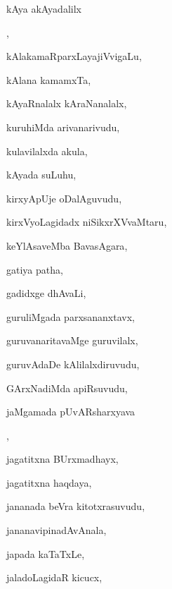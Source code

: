 \begin{multicols}{3}
{\noindent
{kAya akAyadalilx}

\noindent
{}, \pageref{kAya akAyadalilx aDaguvudu}

\noindent
{kAlakamaRparxLayajiVvigaLu}, \pageref{kAlakamaRparxLayajiVvigaLu}

\noindent
{kAlana kamamxTa}, \pageref{kAlana kamamxTa}

\noindent
{kAyaRnalalx kAraNanalalx}, \pageref{kAyaRnalalx kAraNanalalx}

\noindent
{kuruhiMda arivanarivudu}, \pageref{kuruhiMda arivanarivudu}

\noindent
{kulavilalxda akula}, \pageref{kulavilalxda akula}

\noindent
{kAyada suLuhu}, \pageref{kAyada suLuhu}

\noindent
{kirxyApUje oDalAguvudu}, \pageref{kirxyApUje oDalAguvudu}

\noindent
{kirxVyoLagidadx niSikxrXVvaMtaru}, \pageref{kirxVyoLagidadx niSikxrXVvaMtaru}

\noindent
{keYlAsaveMba BavasAgara}, \pageref{keYlAsaveMba BavasAgara}

\noindent
{gatiya patha}, \pageref{gatiya patha}

\noindent
{gadidxge dhAvaLi}, \pageref{gadidxge dhAvaLi}

\noindent
{guruliMgada parxsananxtavx}, \pageref{guruliMgada parxsananxtavx}

\noindent
{guruvanaritavaMge guruvilalx}, \pageref{guruvanaritavaMge guruvilalx}

\noindent
{guruvAdaDe kAlilalxdiruvudu}, \pageref{guruvAdaDe kAlilalxdiruvudu}

\noindent
{GArxNadiMda apiRsuvudu}, \pageref{GArxNadiMda apiRsuvudu}

\noindent
{jaMgamada pUvARsharxyava}

\noindent
{}, \pageref{jaMgamada pUvARsharxyava kaLeyuvudu}

\noindent
{jagatitxna BUrxmadhayx}, \pageref{jagatitxna BUrxmadhayx}

\noindent
{jagatitxna haqdaya}, \pageref{jagatitxna haqdaya}

\noindent
{jananada beVra kitotxrasuvudu}, \pageref{jananada beVra kitotxrasuvudu}

\noindent
{jananavipinadAvAnala}, \pageref{jananavipinadAvAnala}

\noindent
{japada kaTaTxLe}, \pageref{japada kaTaTxLe}

\noindent
{jaladoLagidaR kicucx}, \pageref{jaladoLagidaR kicucx}

}
\end{multicols}
